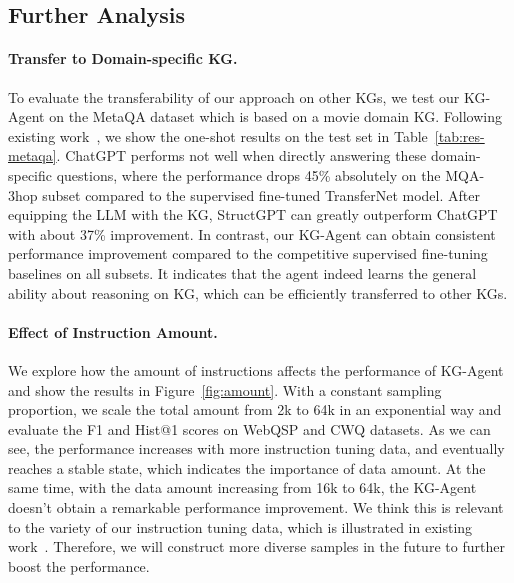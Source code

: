 \subsection{Further Analysis}

\paragraph{Transfer to Domain-specific KG.}
To evaluate the transferability of our approach on other KGs, we test our KG-Agent on the MetaQA dataset which is based on a movie domain KG. 
Following existing work~\cite{NSM, Jiang-2023-arxiv-StructGPT}, we show the one-shot results on the test set in Table~\ref{tab:res-metaqa}. ChatGPT performs not well when directly answering these domain-specific questions, where the performance drops 45\% absolutely on the MQA-3hop subset compared to the supervised fine-tuned TransferNet model. After equipping the LLM with the KG, StructGPT can greatly outperform ChatGPT with about 37\% improvement. In contrast, our KG-Agent can obtain consistent performance improvement compared to the competitive supervised fine-tuning baselines on all subsets. It indicates that the agent indeed learns the general ability about reasoning on KG, which can be efficiently transferred to other KGs.

\paragraph{Effect of Instruction Amount.}
We explore how the amount of instructions affects the performance of KG-Agent and show the results in Figure~\ref{fig:amount}. With a constant sampling proportion, we scale the total amount from 2k to 64k in an exponential way and evaluate the F1 and Hist@1 scores on WebQSP and CWQ datasets. As we can see, the performance increases with more instruction tuning data, and eventually reaches a stable state, which indicates the importance of data amount. At the same time, with the data amount increasing from 16k to 64k, the KG-Agent doesn't obtain a remarkable performance improvement. We think this is relevant to the variety of our instruction tuning data, which is illustrated in existing work~\cite{Chung-arxiv-2022-Scaling, Aribandi-ICLR-2022-ExT5}. Therefore, we will construct more diverse samples in the future to further boost the performance.

